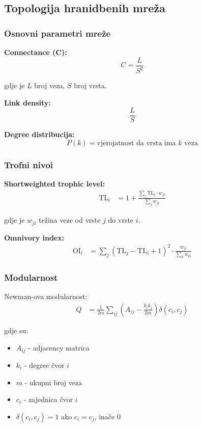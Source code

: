 \documentclass[11pt,oneside]{book}
\begin{document}
\subsection{Topologija hranidbenih mreža}

\subsubsection{Osnovni parametri mreže}

\textbf{Connectance (C):}
\begin{equation}
	C = \frac{L}{S^2}
\end{equation}

gdje je $L$ broj veza, $S$ broj vrsta.

\textbf{Link density:}
\begin{equation}
	\frac{L}{S}
\end{equation}

\textbf{Degree distribucija:}
\begin{equation}
	P(k) = \text{vjerojatnost da vrsta ima } k \text{ veza}
\end{equation}

\subsubsection{Trofni nivoi}

\textbf{Shortweighted trophic level:}
\begin{align}
	\text{TL}_i &= 1 + \frac{\sum_j \text{TL}_j \cdot w_{ji}}{\sum_j w_{ji}}
\end{align}

gdje je $w_{ji}$ težina veze od vrste $j$ do vrste $i$.

\textbf{Omnivory index:}
\begin{align}
	\text{OI}_i &= \sum_j (\text{TL}_j - \text{TL}_i + 1)^2 \cdot \frac{w_{ji}}{\sum_k w_{ki}}
\end{align}

\subsubsection{Modularnost}

Newman-ova modularnost:
\begin{align}
	Q &= \frac{1}{2m} \sum_{ij} \left(A_{ij} - \frac{k_i k_j}{2m}\right) \delta(c_i, c_j)
\end{align}

gdje su:
\begin{itemize}
	\item $A_{ij}$ - adjacency matrica
	\item $k_i$ - degree čvor $i$ 
	\item $m$ - ukupni broj veza
	\item $c_i$ - zajednica čvor $i$
\item $\delta(c_i, c_j) = 1$ ako $c_i = c_j$, inače $0$
\end{itemize}
\end{document}
